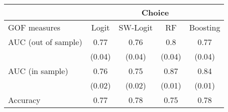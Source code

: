 \begin{tabular}{lcccc}
\toprule
      & \multicolumn{4}{c}{Choice} \\
\midrule
\midrule
GOF measures & Logit & SW-Logit & RF    & Boosting \\
\midrule
\midrule
AUC (out of sample) & 0.77  & 0.76  & 0.8   & 0.77 \\
      & (0.04) & (0.04) & (0.04) & (0.04) \\
AUC (in sample) & 0.76  & 0.75  & 0.87  & 0.84 \\
      & (0.02) & (0.02) & (0.01) & (0.01) \\
Accuracy & 0.77  & 0.78  & 0.75  & 0.78 \\
\bottomrule
\bottomrule
\end{tabular}%
